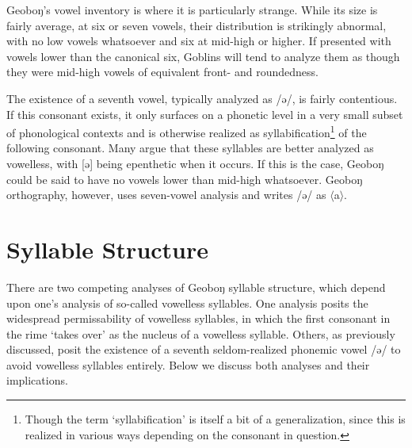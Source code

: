 \documentclass[a4paper,11pt,oneside,openany]{memoir}
\newcommand{\til}{\textasciitilde}
\newcommand{\ortho}[1]{$\langle$#1$\rangle$}
\newcommand{\bripa}[1]{[#1]}
\newcommand{\phipa}[1]{/#1/}
\newcommand{\engma}{ŋ}
\newcommand{\unro}{ɤ}
\newcommand{\schwa}{ə}
\newcommand{\centruh}{ɜ}
\newcommand{\centra}{ɐ}
\begin{document}
Geobo\engma's vowel inventory is where it is particularly strange. While its size is fairly average, at six or seven vowels, their distribution is strikingly abnormal, with no low vowels whatsoever and six at mid-high or higher. If presented with vowels lower than the canonical six, Goblins will tend to analyze them as though they were mid-high vowels of equivalent front- and roundedness. 

The existence of a seventh vowel, typically analyzed as \phipa{\schwa}, is fairly contentious. If this consonant exists, it only surfaces on a phonetic level in a very small subset of phonological contexts and is otherwise realized as syllabification\footnote{Though the term `syllabification' is itself a bit of a generalization, since this is realized in various ways depending on the consonant in question.} of the following consonant. 
Many argue that these syllables are better analyzed as vowelless, with \bripa{\schwa} being epenthetic when it occurs. If this is the case, Geobo\engma{} could be said to have no vowels lower than mid-high whatsoever. Geobo\engma{} orthography, however, uses seven-vowel analysis and writes \phipa{\schwa} as \ortho{a}.


\section{Syllable Structure}

There are two competing analyses of Geobo\engma{} syllable structure, which depend upon one's analysis of so-called vowelless syllables. One analysis posits the widespread permissability of vowelless syllables, in which the first consonant in the rime `takes over' as the nucleus of a vowelless syllable. Others, as previously discussed, posit the existence of a seventh seldom-realized phonemic vowel \phipa{\schwa} to avoid vowelless syllables entirely. Below we discuss both analyses and their implications.
\end{document}
